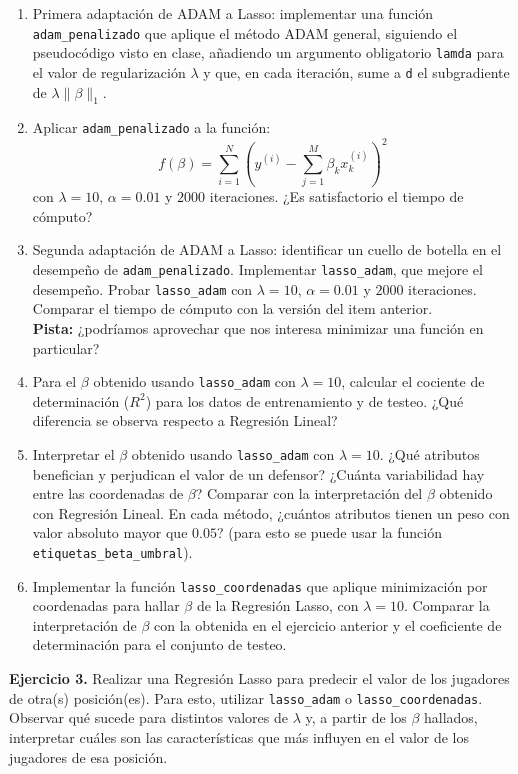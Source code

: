 \documentclass{article}
\begin{document}
    \begin{enumerate}
        \item Primera adaptación de ADAM a Lasso: implementar una función \texttt{adam\_penalizado} que aplique el
        método ADAM general, siguiendo el pseudocódigo visto en clase,
        añadiendo un argumento obligatorio \texttt{lamda} para el valor de regularización $\lambda$ y que, en cada
        iteración, sume a \texttt{d} el subgradiente de $\lambda\lVert\beta\rVert_1$.
        \item Aplicar \texttt{adam\_penalizado} a la función:
        \[f(\beta) = \sum_{i=1}^N \left(y^{(i)} - \sum_{j=1}^M\beta_k x_k^{(i)}\right)^2\]
        con $\lambda=10$, $\alpha=0.01$ y $2000$ iteraciones. ¿Es satisfactorio el tiempo de cómputo?
        \item Segunda adaptación de ADAM a Lasso: identificar un cuello de botella en el desempeño de
        \texttt{adam\_penalizado}. Implementar \texttt{lasso\_adam}, que mejore el desempeño. Probar
        \texttt{lasso\_adam} con $\lambda=10$, $\alpha=0.01$ y $2000$ iteraciones. Comparar el tiempo de cómputo con
        la versión del item anterior. \\
        \textbf{Pista:} ¿podríamos aprovechar que nos interesa minimizar una función en particular?
        \item Para el $\beta$ obtenido usando \texttt{lasso\_adam} con $\lambda=10$, calcular el cociente de determinación
        ($R^2$) para los datos de entrenamiento y de testeo. ¿Qué diferencia se observa respecto a Regresión Lineal?
        \item Interpretar el $\beta$ obtenido usando \texttt{lasso\_adam} con $\lambda=10$. ¿Qué atributos benefician y
        perjudican el valor de un defensor? ¿Cuánta variabilidad hay entre las coordenadas de $\beta$? Comparar con la
        interpretación del $\beta$ obtenido con Regresión Lineal. En cada método, ¿cuántos atributos tienen un peso
        con valor absoluto mayor que $0.05$? (para esto se puede usar la función \texttt{etiquetas\_beta\_umbral}).
        \item Implementar la función \texttt{lasso\_coordenadas} que aplique minimización por coordenadas para hallar
        $\beta$ de la Regresión Lasso, con $\lambda=10$. Comparar la interpretación de $\beta$ con la obtenida en el
        ejercicio anterior y el coeficiente de determinación para el conjunto de testeo.
    \end{enumerate}

    \textbf{Ejercicio 3.} Realizar una Regresión Lasso para predecir el valor de los jugadores de otra(s) posición(es).
    Para esto, utilizar \texttt{lasso\_adam} o \texttt{lasso\_coordenadas}.
    Observar qué sucede para distintos valores de $\lambda$ y, a partir de los $\beta$ hallados,
    interpretar cuáles son las características que más influyen en el valor de los jugadores de esa posición.
\end{document}
